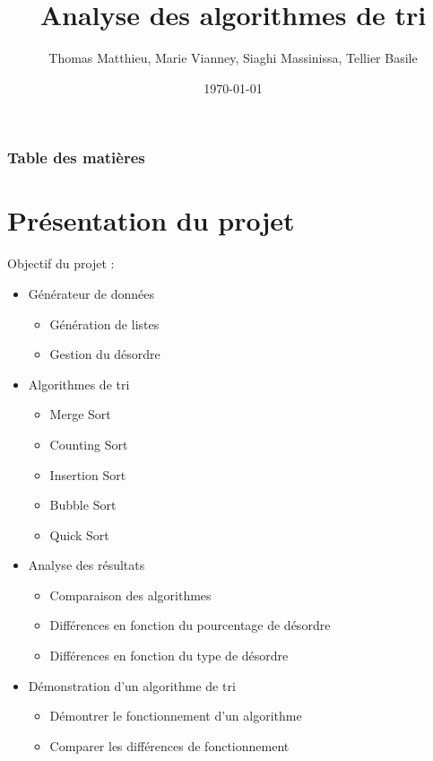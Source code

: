 \documentclass[10pt]{beamer}
\author{Thomas Matthieu, Marie Vianney, Siaghi Massinissa, Tellier Basile}
\date{\today}
\title{Analyse des algorithmes de tri}
\begin{document}
\begin{frame}
\maketitle
\end{frame}

\begin{frame}
\frametitle{Table des matières}
\tableofcontents
\end{frame}

\section{Présentation du projet}
\begin{frame}
Objectif du projet :
  \begin{itemize}
      \item <1-> Générateur de données 
      \begin{itemize}
        \item Génération de listes
        \item Gestion du désordre
      \end{itemize}   
      \item <2-> Algorithmes de tri 
      \begin{itemize}
        \item Merge Sort
        \item Counting Sort
        \item Insertion Sort
        \item Bubble Sort 
        \item Quick Sort 
      \end{itemize}
      \item <3-> Analyse des résultats
        \begin{itemize}
          \item Comparaison des algorithmes 
          \item Différences en fonction du pourcentage de désordre 
          \item Différences en fonction du type de désordre 
        \end{itemize}
      \item <4-> Démonstration d'un algorithme de tri
        \begin{itemize}
          \item Démontrer le fonctionnement d'un algorithme 
          \item Comparer les différences de fonctionnement
        \end{itemize}
  \end{itemize}
\end{frame}
\end{document}
